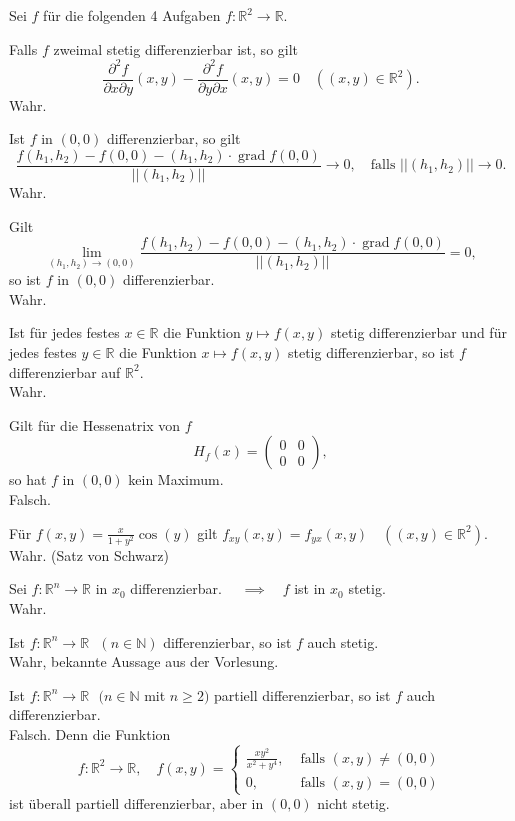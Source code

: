 \documentclass[parskip=full]{scrartcl}
\DeclareMathOperator{\grad}{grad}
\begin{document}
Sei $f$ für die folgenden 4 Aufgaben $f : \mathbb{R}^2 \to \mathbb{R}$.

Falls $f$ zweimal stetig differenzierbar ist, so gilt
\begin{displaymath}
  \frac{\partial^2 f}{\partial x \partial y}(x,y) - \frac{\partial^2 f}{\partial y \partial x}(x,y) = 0 \quad ((x,y) \in \mathbb{R}^2).
\end{displaymath}
Wahr.

Ist $f$ in $(0,0)$ differenzierbar, so gilt
\begin{displaymath}
  \frac{f(h_1, h_2) - f(0,0) - (h_1,h_2) \cdot \grad f(0,0)}{||(h_1, h_2)||} \to 0, \quad \text{falls } ||(h_1, h_2)|| \to 0.
\end{displaymath}
Wahr.

Gilt
\begin{displaymath}
  \lim_{(h_1, h_2) \to (0,0)} \frac{f(h_1, h_2) - f(0,0) - (h_1,h_2) \cdot \grad f(0,0)}{||(h_1, h_2)||} = 0,
\end{displaymath}
so ist $f$ in $(0,0)$ differenzierbar.\\
Wahr.

Ist für jedes festes $x\in \mathbb{R}$ die Funktion $y \mapsto f(x,y)$ stetig differenzierbar und für jedes festes $y \in \mathbb{R}$ die Funktion $x \mapsto f(x,y)$ stetig differenzierbar, so ist $f$ differenzierbar auf $\mathbb{R}^2$.\\
Wahr.

Gilt für die Hessenatrix von $f$
\begin{displaymath}
  H_f(x) = \begin{pmatrix} 0 & 0 \\ 0 & 0\end{pmatrix},
\end{displaymath}
so hat $f$ in $(0,0)$ kein Maximum.\\
Falsch.

Für $f(x,y) = \frac{x}{1 +y^2} \cos(y)$ gilt $f_{xy}(x,y) = f_{yx}(x,y) \quad ((x,y) \in \mathbb{R}^2)$.\\
Wahr. (Satz von Schwarz)

Sei $f : \mathbb{R}^n \to \mathbb{R}$ in $x_0$ differenzierbar. $\quad \implies \quad f$ ist in $x_0$ stetig.\\
Wahr.

Ist $f : \mathbb{R}^n \to \mathbb{R} \text{ } (n \in \mathbb{N})$ differenzierbar, so ist $f$ auch stetig.\\
Wahr, bekannte Aussage aus der Vorlesung.

Ist $f : \mathbb{R}^n \to \mathbb{R} \text{ } (n \in \mathbb{N}$ mit $n \geq 2)$ partiell differenzierbar, so ist $f$ auch differenzierbar.\\
Falsch.
Denn die Funktion
\begin{displaymath}
  f : \mathbb{R}^2 \to \mathbb{R}, \quad f(x,y) =
  \begin{cases}
    \frac{xy^2}{x^2+y^4},& \text{ falls } (x,y) \neq (0,0)\\
    0,& \text{ falls } (x,y) = (0,0)
  \end{cases}
\end{displaymath}
ist überall partiell differenzierbar, aber in $(0,0)$ nicht stetig.
\end{document}
